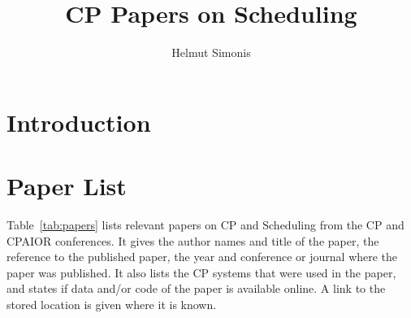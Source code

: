 \documentclass[a4paper]{article}
\title{CP Papers on Scheduling}
\author{Helmut Simonis}
\begin{document}
\maketitle
\section{Introduction}

\section{Paper List}

Table~\ref{tab:papers} lists relevant papers on CP and Scheduling from the CP and CPAIOR conferences. It gives the author names and title of the paper, the reference to the published paper, the year and conference or journal where the paper was published. It also lists the CP systems that were used in the paper, and states if data and/or code of the paper is available online. A link to the stored location is given where it is known. 
\end{document}
